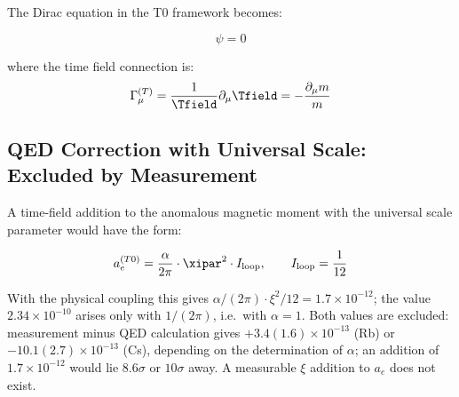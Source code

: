 	The Dirac equation in the T0 framework becomes:
	
	\begin{equation}
		[i\gamma^{\mu}(\partial_{\mu} + \Gamma_{\mu}^{(T)}) - m(x,t)]\psi = 0
		\label{eq:t0_dirac}
	\end{equation}
	
	where the time field connection is:
	\begin{equation}
		\Gamma_{\mu}^{(T)} = \frac{1}{\Tfield} \partial_{\mu} \Tfield = -\frac{\partial_{\mu} m}{m}
		\label{eq:time_field_connection}
	\end{equation}
	
	\subsection{QED Correction with Universal Scale: Excluded by Measurement}
	\label{subsec:qed_corrections_universal}
	
	A time-field addition to the anomalous magnetic moment with the universal scale parameter would have the form:
	
	\begin{equation}
		a_e^{(T0)} = \frac{\alpha}{2\pi} \cdot \xipar^2 \cdot I_{\text{loop}}, \qquad I_{\text{loop}} = \frac{1}{12}
		\label{eq:anomalous_moment_correction}
	\end{equation}
	
	With the physical coupling this gives $\alpha/(2\pi)\cdot\xi^2/12 = 1.7\times10^{-12}$; the value $2.34\times10^{-10}$ arises only with $1/(2\pi)$, i.e.\ with $\alpha=1$. Both values are excluded: measurement minus QED calculation gives $+3.4(1.6)\times10^{-13}$ (Rb) or $-10.1(2.7)\times10^{-13}$ (Cs), depending on the determination of $\alpha$; an addition of $1.7\times10^{-12}$ would lie $8.6\sigma$ or $10\sigma$ away. A measurable $\xi$ addition to $a_e$ does not exist.
	
